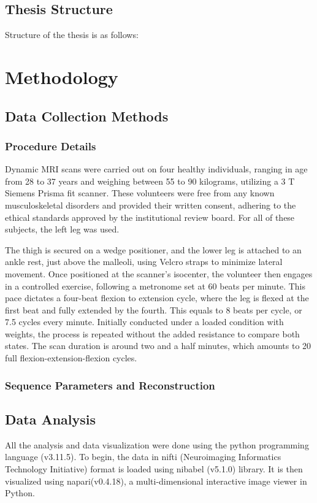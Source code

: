 \documentclass{micro-econ-thesis}
\begin{document}
\subsection{Thesis Structure}
Structure of the thesis is as follows: 


\section{Methodology}
\label{sec:second}

\subsection{Data Collection Methods}

\subsubsection{Procedure Details}
Dynamic MRI scans were carried out on four healthy individuals, ranging in age from 28 to 37 years and weighing between 55 to 90 kilograms, utilizing a 3 T Siemens Prisma fit scanner. These volunteers were free from any known musculoskeletal disorders and provided their written consent, adhering to the ethical standards approved by the institutional review board. For all of these subjects, the left leg was used. 

The thigh is secured on a wedge positioner, and the lower leg is attached to an ankle rest, just above the malleoli, using Velcro straps to minimize lateral movement. Once positioned at the scanner's isocenter, the volunteer then engages in a controlled exercise, following a metronome set at 60 beats per minute. This pace dictates a four-beat flexion to extension cycle, where the leg is flexed at the first beat and fully extended by the fourth. This equals to 8 beats per cycle, or 7.5 cycles every minute. Initially conducted under a loaded condition with weights, the process is repeated without the added resistance to compare both states. The scan duration is around two and a half minutes, which amounts to 20 full flexion-extension-flexion cycles. 

\subsubsection{Sequence Parameters and Reconstruction}


\subsection{Data Analysis}
All the analysis and data visualization were done using the python programming language (v3.11.5). To begin, the data in nifti (Neuroimaging Informatics Technology Initiative) format is loaded using nibabel (v5.1.0) library. It is then visualized using napari(v0.4.18), a multi-dimensional interactive image viewer in Python. 
\end{document}
